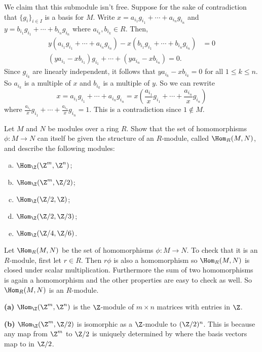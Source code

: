 \documentclass[11pt,letterpaper]{article}
\begin{document}
We claim that this submodule isn't free. Suppose for the sake of contradiction that $\{g_i\}_{i\in I}$ is a basis for $M$. Write $x=a_{i_1}g_{i_1}+\cdots+a_{i_n}g_{i_n}$ and $y=b_{i_1}g_{i_1}+\cdots+b_{i_n}g_{i_n}$ where $a_{i_k}, b_{i_k}\in R$. Then,
\[
  \begin{aligned}
    y(a_{i_1}g_{i_1}+\cdots+a_{i_n}g_{i_n})-x(b_{i_1}g_{i_1}+\cdots+b_{i_n}g_{i_n})&=0\\
    (ya_{i_1}-xb_{i_1})g_{i_1}+\cdots+(ya_{i_n}-xb_{i_n})=0.
  \end{aligned}  
\]
Since $g_{i_k}$ are linearly independent, it follows that $ya_{i_k}-xb_{i_k}=0$ for all $1\leq k\leq n$. So $a_{i_k}$ is a multiple of $x$ and $b_{i_k}$ is a multiple of $y$. So we can rewrite
\[
  x=a_{i_1}g_{i_1}+\cdots+a_{i_n}g_{i_n}=x\left(\frac{a_{i_1}}{x}g_{i_1}+\cdots+\frac{a_{i_n}}{x}g_{i_n}\right)
\]
where $\frac{a_{i_1}}{x}g_{i_1}+\cdots+\frac{a_{i_n}}{x}g_{i_n}=1$. This is a contradiction since $1\not\in M$. 
 
\pagebreak
\begin{problem}
  Let $M$ and $N$ be modules over a ring $R$. Show that the set of homomorphisms $\phi : M \to N$ can itself be given the structure of an $R$-module, called $\Hom_R(M,N)$, and describe the following modules:
  \begin{enumerate}[(a)]
    \item $\Hom_\Z(\Z^m,\Z^n)$;
    \item $\Hom_\Z(\Z^m,\Z/2)$;
    \item $\Hom_\Z(\Z/2,\Z)$;
    \item $\Hom_\Z(\Z/2,\Z/3)$;
    \item $\Hom_\Z(\Z/4,\Z/6)$.
  \end{enumerate}
\end{problem}

Let $\Hom_R(M,N)$ be the set of homomorphisms $\phi : M \to N$. To check that it is an $R$-module, first let $r\in R$. Then $r\phi$ is also a homomorphism so $\Hom_R(M,N)$ is closed under scalar multiplication. Furthermore the sum of two homomorphisms is again a homomorphism and the other properties are easy to check as well. So $\Hom_R(M,N)$ is an $R$-module. 

\textbf{(a)} $\Hom_\Z(\Z^m,\Z^n)$ is the $\Z$-module of $m\times n$ matrices with entries in $\Z$.   

\textbf{(b)} $\Hom_\Z(\Z^m,\Z/2)$ is isomorphic as a $\Z$-module to $(\Z/2)^n$. This is because any map from $\Z^m$ to $\Z/2$ is uniquely determined by where the basis vectors map to in $\Z/2$.
\end{document}
